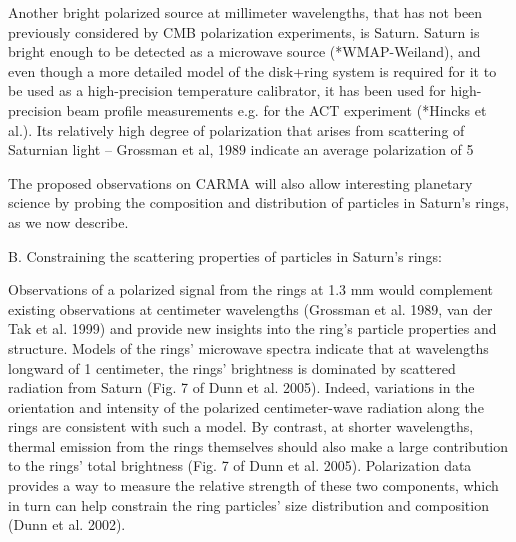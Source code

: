 \documentclass[a4paper,12pt]{article}
\begin{document}
Another bright polarized source at millimeter wavelengths, that has
not been previously considered by CMB polarization experiments, is
Saturn. Saturn is bright enough to be detected as a microwave source
(*WMAP-Weiland), and even though a more detailed model of the
disk+ring system is required for it to be used as a high-precision
temperature calibrator, it has been used for high-precision beam
profile measurements e.g. for the ACT experiment (*Hincks et al.). Its
relatively high degree of polarization that arises from scattering of
Saturnian light -- Grossman et al, 1989 indicate an average
polarization of 5%

The proposed observations on CARMA will also allow interesting planetary science by probing the composition and distribution of particles in Saturn's rings, as we now describe.

B. Constraining the scattering properties of particles in Saturn's rings:

Observations of a polarized signal from the rings at 1.3 mm would
complement existing observations at centimeter wavelengths  (Grossman
et al. 1989, van der Tak et al. 1999) and provide new insights into
the ring's particle properties and structure. Models of the rings'
microwave spectra indicate that at wavelengths longward of 1
centimeter, the rings' brightness is dominated by scattered radiation
from Saturn (Fig. 7 of Dunn et al. 2005). Indeed, variations in the
orientation and intensity of the polarized centimeter-wave radiation
along the rings are consistent with such a model. By contrast, at
shorter wavelengths, thermal emission from the rings themselves should
also make a large contribution to the rings' total brightness (Fig. 7
of Dunn et al. 2005). Polarization data provides a way to measure the
relative strength of these two components, which in turn can help
constrain the ring particles' size distribution and composition (Dunn
et al. 2002). 
\end{document}
